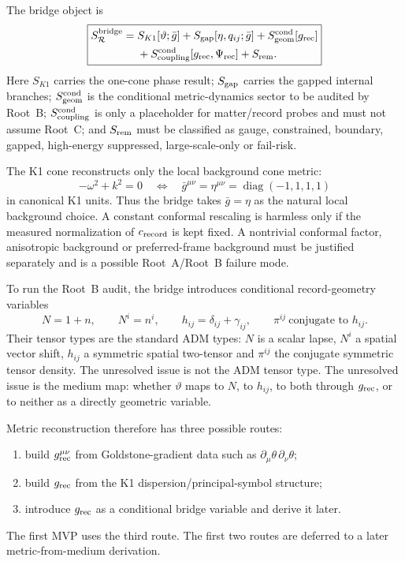 \documentclass[11pt]{article}
\begin{document}
The bridge object is
\[
\boxed{
\begin{aligned}
S_{\mathcal R}^{\rm bridge}={}&
S_{K1}[\vartheta;\bar g]
+S_{\rm gap}[\eta,q_{ij};\bar g]
+S_{\rm geom}^{\rm cond}[g_{\rm rec}]\\
&+S_{\rm coupling}^{\rm cond}[g_{\rm rec},\Psi_{\rm rec}]
+S_{\rm rem}.
\end{aligned}
}
\]
Here \(S_{K1}\) carries the one-cone phase result; \(S_{\rm gap}\) carries the
gapped internal branches; \(S_{\rm geom}^{\rm cond}\) is the conditional
metric-dynamics sector to be audited by Root~B; \(S_{\rm coupling}^{\rm cond}\)
is only a placeholder for matter/record probes and must not assume Root~C; and
\(S_{\rm rem}\) must be classified as gauge, constrained, boundary, gapped,
high-energy suppressed, large-scale-only or fail-risk.

The K1 cone reconstructs only the local background cone metric:
\[
\boxed{
-\omega^2+k^2=0
\quad\Longleftrightarrow\quad
\bar g^{\mu\nu}=\eta^{\mu\nu}=\operatorname{diag}(-1,1,1,1)
}
\]
in canonical K1 units.  Thus the bridge takes \(\bar g=\eta\) as the natural
local background choice.  A constant conformal rescaling is harmless only if
the measured normalization of \(c_{\rm record}\) is kept fixed.  A nontrivial
conformal factor, anisotropic background or preferred-frame background must be
justified separately and is a possible Root~A/Root~B failure mode.

To run the Root~B audit, the bridge introduces conditional record-geometry
variables
\[
\boxed{
N=1+n,\qquad N^i=n^i,\qquad h_{ij}=\delta_{ij}+\gamma_{ij},\qquad
\pi^{ij}\ \text{conjugate to }h_{ij}.
}
\]
Their tensor types are the standard ADM types: \(N\) is a scalar lapse,
\(N^i\) a spatial vector shift, \(h_{ij}\) a symmetric spatial two-tensor and
\(\pi^{ij}\) the conjugate symmetric tensor density.  The unresolved issue is
not the ADM tensor type.  The unresolved issue is the medium map: whether
\(\vartheta\) maps to \(N\), to \(h_{ij}\), to both through \(g_{\rm rec}\), or
to neither as a directly geometric variable.

Metric reconstruction therefore has three possible routes:
\begin{enumerate}
\item build \(g_{\rm rec}^{\mu\nu}\) from Goldstone-gradient data such as
  \(\partial_\mu\theta\,\partial_\nu\theta\);
\item build \(g_{\rm rec}\) from the K1 dispersion/principal-symbol
  structure;
\item introduce \(g_{\rm rec}\) as a conditional bridge variable and derive it
  later.
\end{enumerate}
The first MVP uses the third route.  The first two routes are deferred to a
later metric-from-medium derivation.
\end{document}
